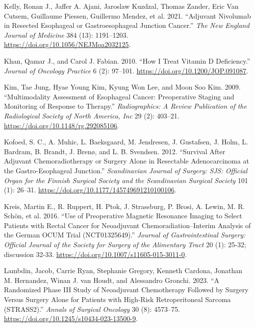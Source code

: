 \documentclass[
  letterpaper,
]{scrbook}
\newlength{\cslhangindent}
\newenvironment{CSLReferences}[2] %
 {\begin{list}{}{%
  \setlength{\itemindent}{0pt}
  \setlength{\leftmargin}{0pt}
  \setlength{\parsep}{0pt}
  \ifodd #1
   \setlength{\leftmargin}{\cslhangindent}
   \setlength{\itemindent}{-1\cslhangindent}
  \fi
  \setlength{\itemsep}{#2\baselineskip}}}
 {\end{list}}
\begin{document}
\begin{CSLReferences}{1}{0}
Kelly, Ronan J., Jaffer A. Ajani, Jaroslaw Kuzdzal, Thomas Zander, Eric
Van Cutsem, Guillaume Piessen, Guillermo Mendez, et al. 2021.
{``Adjuvant {Nivolumab} in {Resected} {Esophageal} or {Gastroesophageal}
{Junction} {Cancer}.''} \emph{The New England Journal of Medicine} 384
(13): 1191--1203. \url{https://doi.org/10.1056/NEJMoa2032125}.

Khan, Qamar J., and Carol J. Fabian. 2010. {``How {I} {Treat} {Vitamin}
{D} {Deficiency}.''} \emph{Journal of Oncology Practice} 6 (2): 97--101.
\url{https://doi.org/10.1200/JOP.091087}.

Kim, Tae Jung, Hyae Young Kim, Kyung Won Lee, and Moon Soo Kim. 2009.
{``Multimodality Assessment of Esophageal Cancer: Preoperative Staging
and Monitoring of Response to Therapy.''} \emph{Radiographics: A Review
Publication of the Radiological Society of North America, Inc} 29 (2):
403--21. \url{https://doi.org/10.1148/rg.292085106}.

Kofoed, S. C., A. Muhic, L. Baeksgaard, M. Jendresen, J. Gustafsen, J.
Holm, L. Bardram, B. Brandt, J. Brenø, and L. B. Svendsen. 2012.
{``Survival After Adjuvant Chemoradiotherapy or Surgery Alone in
Resectable Adenocarcinoma at the Gastro-Esophageal Junction.''}
\emph{Scandinavian Journal of Surgery: SJS: Official Organ for the
Finnish Surgical Society and the Scandinavian Surgical Society} 101 (1):
26--31. \url{https://doi.org/10.1177/145749691210100106}.

Kreis, Martin E., R. Ruppert, H. Ptok, J. Strassburg, P. Brosi, A.
Lewin, M. R. Schön, et al. 2016. {``Use of {Preoperative} {Magnetic}
{Resonance} {Imaging} to {Select} {Patients} with {Rectal} {Cancer} for
{Neoadjuvant} {Chemoradiation}--{Interim} {Analysis} of the {German}
{OCUM} {Trial} ({NCT01325649}).''} \emph{Journal of Gastrointestinal
Surgery: Official Journal of the Society for Surgery of the Alimentary
Tract} 20 (1): 25-32; discussion 32-33.
\url{https://doi.org/10.1007/s11605-015-3011-0}.

Lambdin, Jacob, Carrie Ryan, Stephanie Gregory, Kenneth Cardona,
Jonathan M. Hernandez, Winan J. van Houdt, and Alessandro Gronchi. 2023.
{``A {Randomized} {Phase} {III} {Study} of {Neoadjuvant} {Chemotherapy}
{Followed} by {Surgery} {Versus} {Surgery} {Alone} for {Patients} with
{High}-{Risk} {Retroperitoneal} {Sarcoma} ({STRASS2}).''} \emph{Annals
of Surgical Oncology} 30 (8): 4573--75.
\url{https://doi.org/10.1245/s10434-023-13500-9}.


\end{CSLReferences}
\end{document}
